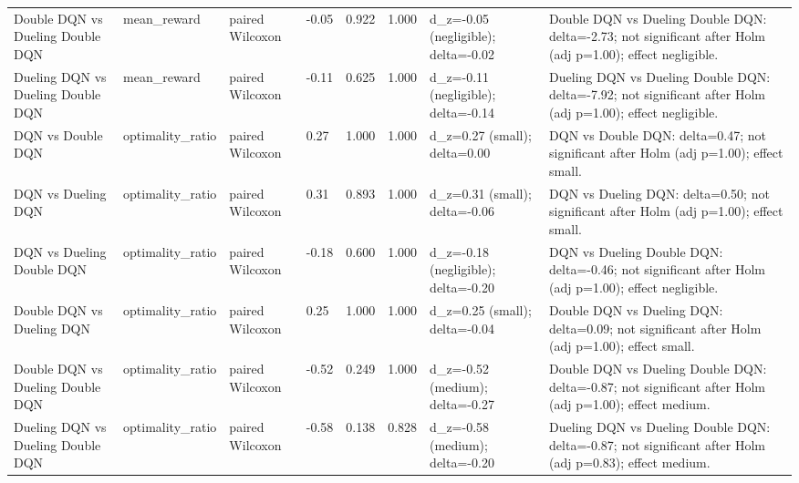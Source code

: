 \begin{tabular}{llllllll}
Double DQN vs Dueling Double DQN & mean\_reward & paired Wilcoxon & -0.05 & 0.922 & 1.000 & d\_z=-0.05 (negligible); delta=-0.02 & Double DQN vs Dueling Double DQN: delta=-2.73; not significant after Holm (adj p=1.00); effect negligible. \\
Dueling DQN vs Dueling Double DQN & mean\_reward & paired Wilcoxon & -0.11 & 0.625 & 1.000 & d\_z=-0.11 (negligible); delta=-0.14 & Dueling DQN vs Dueling Double DQN: delta=-7.92; not significant after Holm (adj p=1.00); effect negligible. \\
DQN vs Double DQN & optimality\_ratio & paired Wilcoxon & 0.27 & 1.000 & 1.000 & d\_z=0.27 (small); delta=0.00 & DQN vs Double DQN: delta=0.47; not significant after Holm (adj p=1.00); effect small. \\
DQN vs Dueling DQN & optimality\_ratio & paired Wilcoxon & 0.31 & 0.893 & 1.000 & d\_z=0.31 (small); delta=-0.06 & DQN vs Dueling DQN: delta=0.50; not significant after Holm (adj p=1.00); effect small. \\
DQN vs Dueling Double DQN & optimality\_ratio & paired Wilcoxon & -0.18 & 0.600 & 1.000 & d\_z=-0.18 (negligible); delta=-0.20 & DQN vs Dueling Double DQN: delta=-0.46; not significant after Holm (adj p=1.00); effect negligible. \\
Double DQN vs Dueling DQN & optimality\_ratio & paired Wilcoxon & 0.25 & 1.000 & 1.000 & d\_z=0.25 (small); delta=-0.04 & Double DQN vs Dueling DQN: delta=0.09; not significant after Holm (adj p=1.00); effect small. \\
Double DQN vs Dueling Double DQN & optimality\_ratio & paired Wilcoxon & -0.52 & 0.249 & 1.000 & d\_z=-0.52 (medium); delta=-0.27 & Double DQN vs Dueling Double DQN: delta=-0.87; not significant after Holm (adj p=1.00); effect medium. \\
Dueling DQN vs Dueling Double DQN & optimality\_ratio & paired Wilcoxon & -0.58 & 0.138 & 0.828 & d\_z=-0.58 (medium); delta=-0.20 & Dueling DQN vs Dueling Double DQN: delta=-0.87; not significant after Holm (adj p=0.83); effect medium. \\
\bottomrule
\end{tabular}
